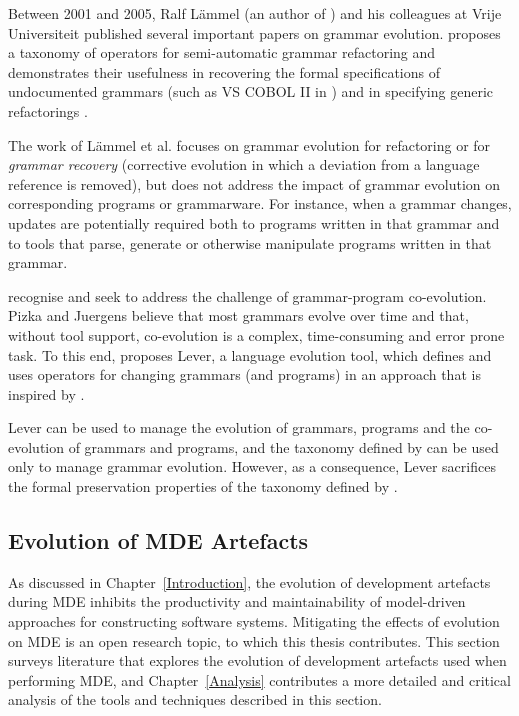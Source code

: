 Between 2001 and 2005, Ralf L\"{a}mmel (an author of \cite{klint03grammarware}) and his colleagues at Vrije Universiteit published several important papers on grammar evolution. \cite{lammel01grammar_adaptation} proposes a taxonomy of operators for semi-automatic grammar refactoring and demonstrates their usefulness in recovering the formal specifications of undocumented grammars (such as VS COBOL II in \cite{lammel01semiautomatic}) and in specifying generic refactorings \cite{lammel02towards}. 

The work of L\"{a}mmel et al. focuses on grammar evolution for refactoring or for \emph{grammar recovery} (corrective evolution in which a deviation from a language reference is removed), but does not address the impact of grammar evolution on corresponding programs or grammarware. For instance, when a grammar changes, updates are potentially required both to programs written in that grammar and to tools that parse, generate or otherwise manipulate programs written in that grammar.

\cite{pizka07automating} recognise and seek to address the challenge of grammar-program co-evolution. Pizka and Juergens believe that most grammars evolve over time and that, without tool support, co-evolution is a complex, time-consuming and error prone task. To this end, \cite{pizka07automating} proposes Lever, a language evolution tool, which defines and uses operators for changing grammars (and programs) in an approach that is inspired by \cite{lammel01grammar_adaptation}.

Lever can be used to manage the evolution of grammars, programs and the co-evolution of grammars and programs, and the taxonomy defined by \cite{lammel01grammar_adaptation} can be used only to manage grammar evolution. However, as a consequence, Lever sacrifices the formal preservation properties of the taxonomy defined by \cite{lammel01grammar_adaptation}.


\subsection{Evolution of MDE Artefacts}
\label{subsec:mde_evo}
As discussed in Chapter~\ref{Introduction}, the evolution of development artefacts during MDE inhibits the productivity and maintainability of model-driven approaches for constructing software systems. Mitigating the effects of evolution on MDE is an open research topic, to which this thesis contributes. This section surveys literature that explores the evolution of development artefacts used when performing MDE, and Chapter~\ref{Analysis} contributes a more detailed and critical analysis of the tools and techniques described in this section.

